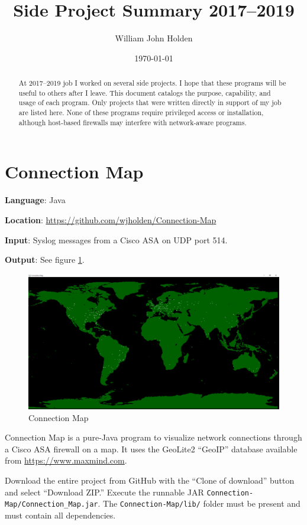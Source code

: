 \documentclass[12pt]{article}
\title{Side Project Summary 2017--2019}
\author{William John Holden}
\date{\today}
\begin{document}
\maketitle

\begin{abstract}
At 2017--2019 job I worked on several side projects.
I hope that these programs will be useful to others after I leave.
This document catalogs the purpose, capability, and usage of each program.
Only projects that were written directly in support of my job are listed here.
None of these programs require privileged access or installation, although host-based firewalls may interfere with network-aware programs.
\end{abstract}

\section{Connection Map}

\textbf{Language}: Java

\textbf{Location}: \url{https://github.com/wjholden/Connection-Map}

\textbf{Input}: Syslog messages from a Cisco ASA on UDP port 514.

\textbf{Output}: See figure \ref{fig:connection-map}.

\begin{figure}[h]
\centering
\includegraphics[width=\textwidth]{Connection-Map}
\caption{Connection Map}
\label{fig:connection-map}
\end{figure}

Connection Map is a pure-Java program to visualize network connections through a Cisco ASA firewall on a map. It uses the GeoLite2 ``GeoIP'' database available from \url{https://www.maxmind.com}.

Download the entire project from GitHub with the ``Clone of download'' button and select ``Download ZIP.'' Execute the runnable JAR \texttt{Connection-Map/Connection\_Map.jar}. The \texttt{Connection-Map/lib/} folder must be present and must contain all dependencies.
\end{document}
